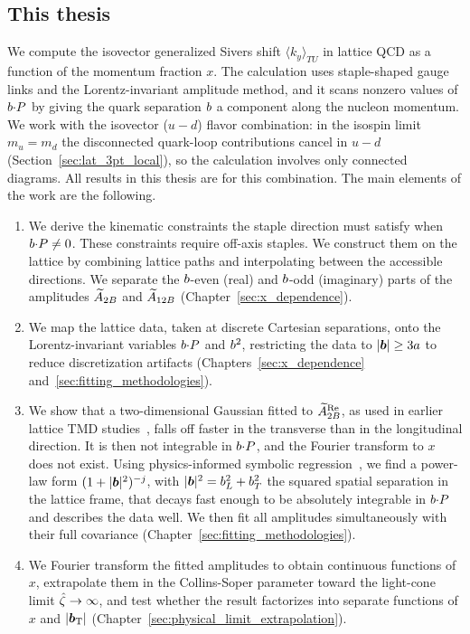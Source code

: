 \subsection{This thesis}
\label{sec:intro_this_thesis}

We compute the isovector generalized Sivers shift $\langle k_y\rangle_{TU}$ in lattice QCD as a function of the momentum fraction $x$. The calculation uses staple-shaped gauge links and the Lorentz-invariant amplitude method, and it scans nonzero values of $b{\cdot} P$ by giving the quark separation $b$ a component along the nucleon momentum. We work with the isovector ($u-d$) flavor combination: in the isospin limit $m_u=m_d$ the disconnected quark-loop contributions cancel in $u-d$ (Section~\ref{sec:lat_3pt_local}), so the calculation involves only connected diagrams. All results in this thesis are for this combination.
The main elements of the work are the following.
\begin{enumerate}
  \item We derive the kinematic constraints the staple direction must satisfy when $b{\cdot} P\neq 0$. These constraints require off-axis staples. We construct them on the lattice by combining lattice paths and interpolating between the accessible directions. We separate the $b$-even (real) and $b$-odd (imaginary) parts of the amplitudes $\widetilde{A}_{2B}$ and $\widetilde{A}_{12B}$ (Chapter~\ref{sec:x_dependence}).
  \item We map the lattice data, taken at discrete Cartesian separations, onto the Lorentz-invariant variables $b{\cdot} P$ and $b^2$, restricting the data to $|\boldsymbol{b}|\geq 3a$ to reduce discretization artifacts (Chapters~\ref{sec:x_dependence} and~\ref{sec:fitting_methodologies}).
  \item We show that a two-dimensional Gaussian fitted to $\widetilde{A}_{2B}^{\text{Re}}$, as used in earlier lattice TMD studies~\cite{Musch:2010ka}, falls off faster in the transverse than in the longitudinal direction. It is then not integrable in $b{\cdot} P$, and the Fourier transform to $x$ does not exist. Using physics-informed symbolic regression~\cite{Cranmer2023pysr}, we find a power-law form $(1+|\boldsymbol{b}|^2)^{-j}$, with $|\boldsymbol{b}|^2=b_L^2+b_T^2$ the squared spatial separation in the lattice frame, that decays fast enough to be absolutely integrable in $b{\cdot} P$ and describes the data well. We then fit all amplitudes simultaneously with their full covariance (Chapter~\ref{sec:fitting_methodologies}).
  \item We Fourier transform the fitted amplitudes to obtain continuous functions of $x$, extrapolate them in the Collins-Soper parameter toward the light-cone limit ${\hat \zeta}\to\infty$, and test whether the result factorizes into separate functions of $x$ and $|\boldsymbol{b}_{\mathrm T}|$ (Chapter~\ref{sec:physical_limit_extrapolation}).
\end{enumerate}
